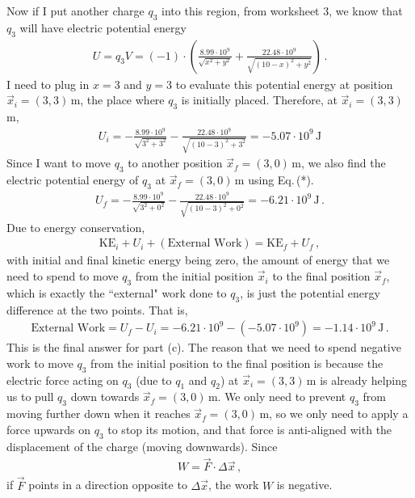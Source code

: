 \documentclass[11pt]{article}
\begin{document}
Now if I put another charge $q_3$ into this region, from worksheet 3, we know that $q_3$ will have electric potential energy 
\begin{align*}
U = q_3V = (-1)\cdot \left(\frac{8.99 \cdot 10^9}{\sqrt{x^2+y^2}}+ \frac{22.48 \cdot 10^9}{\sqrt{(10-x)^2+y^2}}\right)\,. \tag{*}
\end{align*}
I need to plug in $x = 3$ and $y=3$ to evaluate this potential energy at position $\vec{x}_i = (3,3)\,$m, the place where $q_3$ is initially placed. Therefore, at $\vec{x}_i = (3,3)$\,m, 
\begin{align*}
U_i = -\frac{8.99 \cdot 10^9}{\sqrt{3^2+3^2}}-\frac{22.48 \cdot 10^9}{\sqrt{(10-3)^2+3^2}} = -5.07\cdot 10^9\, \text{J}
\end{align*}
Since I want to move $q_3$ to another position $\vec{x}_f = (3,0)$\,m, we also find the electric potential energy of $q_3$ at $\vec{x}_f = (3,0)$\,m using Eq.\,(*). 
\begin{align*}
U_f = -\frac{8.99 \cdot 10^9}{\sqrt{3^2+0^2}}-\frac{22.48 \cdot 10^9}{\sqrt{(10-3)^2+0^2}} = -6.21 \cdot 10^9\,\text{J}\,.
\end{align*}
Due to energy conservation, 
\begin{align*}
\text{KE}_i+ U_i + (\text{External Work})= \text{KE}_f+ U_f\,,
\end{align*}
with initial and final kinetic energy being zero, the amount of energy that we need to spend to move $q_3$ from the initial position $\vec{x}_i$ to the final position $\vec{x}_f$, which is exactly the ``external" work done to $q_3$, is just the potential energy difference at the two points. That is, 
\begin{align*}
\text{External Work} = U_f - U_i = -6.21 \cdot 10^9 - (-5.07\cdot 10^9) = -1.14\cdot 10^9\,\text{J}\,.
\end{align*}
This is the final answer for part (c). The reason that we need to spend negative work to move $q_3$ from the initial position to the final position is because the electric force acting on $q_3$ (due to $q_1$ and $q_2$) at $\vec{x}_i = (3,3)\,$m is already helping us to pull $q_3$ down towards $\vec{x}_f = (3,0)$\,m. We only need to prevent $q_3$ from moving further down when it reaches  $\vec{x}_f = (3,0)$\,m, so we only need to apply a force upwards on $q_3$ to stop its motion, and that force is anti-aligned with the displacement of the charge (moving downwards). Since 
\begin{align*}
W = \vec{F}\cdot \Delta \vec{x}\,,
\end{align*} 
if $\vec{F}$ points in a direction opposite to $\Delta \vec{x}$, the work $W$ is negative.\\
\end{document}
